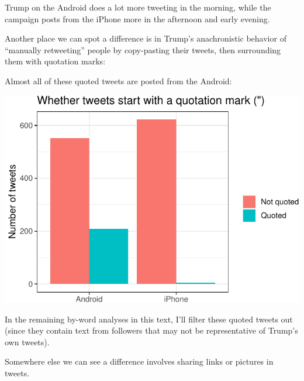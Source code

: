 \documentclass[
]{jss}
\begin{document}
Trump on the Android does a lot more tweeting in the morning, while the
campaign posts from the iPhone more in the afternoon and early evening.

Another place we can spot a difference is in Trump's anachronistic
behavior of ``manually retweeting'' people by copy-pasting their tweets,
then surrounding them with quotation marks:

Almost all of these quoted tweets are posted from the Android:

\begin{CodeChunk}


\begin{center}\includegraphics{Live_Demo2_files/figure-latex/unnamed-chunk-3-1} \end{center}

\end{CodeChunk}

In the remaining by-word analyses in this text, I'll filter these quoted
tweets out (since they contain text from followers that may not be
representative of Trump's own tweets).

Somewhere else we can see a difference involves sharing links or
pictures in tweets.
\end{document}
